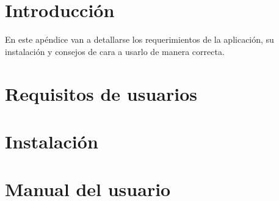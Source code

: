 
\section{Introducción}
En este apéndice van a detallarse los requerimientos de la aplicación, su instalación y consejos de cara a usarlo de manera correcta.

\section{Requisitos de usuarios}

\section{Instalación}

\section{Manual del usuario}


